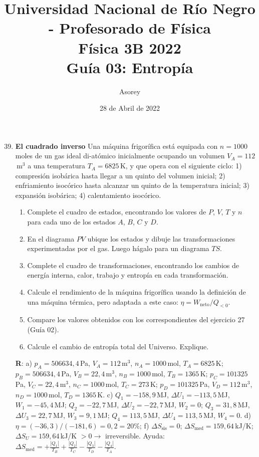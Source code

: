 \documentclass[a4paper,12pt]{article}
\begin{document}
\title{
{\normalsize{Universidad Nacional de Río Negro - Profesorado de Física}}\\
Física 3B 2022 \\ Guía 03: Entropía
}
\author{Asorey}
\date{28 de Abril de 2022}
\maketitle

\begin{enumerate}
	\setcounter{enumi}{38}     

    \item {\bf{El cuadrado inverso}}
		Una máquina frigorífica está equipada con $n=1000$\,moles de un gas
		ideal di-atómico inicialmente ocupando un volumen $V_A=112$\,m$^3$ a
		una temperatura $T_A=6825$\,K, y que opera con el siguiente ciclo: 1)
		compresión isobárica hasta llegar a un quinto del volumen inicial; 2)
		enfriamiento isocórico hasta alcanzar un quinto de la temperatura
		inicial; 3) expansión isobárica; 4) calentamiento isocórico.
		\begin{enumerate}
            \item Complete el cuadro de estados, encontrando los valores de
                $P$, $V$, $T$ y $n$ para cada uno de los estados $A$, $B$, $C$
                y $D$.
            \item En el diagrama $PV$ ubique los estados y dibuje las
				transformaciones experimentadas por el gas. Luego hágalo para
				un diagrama $TS$.
            \item Complete el cuadro de transformaciones, encontrando los
                cambios de energía interna, calor, trabajo y entropía en cada
                transformación.
			\item Calcule el rendimiento de la máquina frigorífica usando la
				definición de una máquina térmica, pero adaptada a este caso:
				$\eta=W_{\mathrm{neto}}/Q_{<0}$.
			\item Compare los valores obtenidos con los correspondientes del
				ejercicio 27 (Guía 02).
			\item Calcule el cambio de entropía total del Universo. Explique.
        \end{enumerate}
        {\bf{R}}: a) 
		$p_A=506634,4$\,Pa, $V_A=112$\,m$^3$, $n_A=1000$\,mol, $T_A=6825$\,K; 
		$p_B=506634,4$\,Pa, $V_B=22,4$\,m$^3$, $n_B=1000$\,mol, $T_B=1365$\,K; 
		$p_C=101325$\,Pa, $V_C=22,4$\,m$^3$, $n_C=1000$\,mol, $T_C=273$\,K; 
		$p_D=101325$\,Pa, $V_D=112$\,m$^3$, $n_D=1000$\,mol, $T_D=1365$\,K. 
		c) 
		$Q_1=-158,9$\,MJ, $\Delta U_1=-113,5$\,MJ, $W_1=-45,4$\,MJ;
		$Q_2=-22,7$\,MJ, $\Delta U_2=-22,7$\,MJ, $W_2=0$;
		$Q_3=31,8$\,MJ, $\Delta U_3=22,7$\,MJ, $W_3=9,1$\,MJ; 
        $Q_4=113,5$\,MJ, $\Delta U_4=113,5$\,MJ, $W_4=0$. 
		d) $\eta=(-36,3)/(-181,6) = 0,2 = 20\%$; 
		f) $\Delta S_{\mathrm{sis}} = 0$; $\Delta
		S_{\mathrm{med}}=159,64$\,kJ/K; $\Delta S_U=159,64$\,kJ/K $>0 \to$
		irreversible. Ayuda: $\Delta S_{\mathrm{med}} = +\frac{|Q_1|}{T_B} +
		\frac{|Q_2|}{T_C} - \frac{|Q_3|}{T_D} - \frac{|Q_4|}{T_A}$.
	

\end{enumerate}
\end{document}
